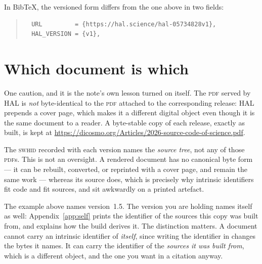\noindent In Bib\TeX{}, the versioned form differs from the one above in two fields:

\begin{quote}\footnotesize
\begin{verbatim}
  URL         = {https://hal.science/hal-05734828v1},
  HAL_VERSION = {v1},
\end{verbatim}
\end{quote}

\section{Which document is which}

One caution, and it is the note's own lesson turned on itself. The \textsc{pdf} served by HAL is
\emph{not} byte-identical to the \textsc{pdf} attached to the corresponding release: HAL prepends
a cover page, which makes it a different digital object even though it is the same document to a
reader. A byte-stable copy of each release, exactly as built, is kept at
\url{https://dicosmo.org/Articles/2026-source-code-of-science.pdf}.

The \textsc{swhid} recorded with each version names the \emph{source tree}, not any of those
\textsc{pdf}s. This is not an oversight. A rendered document has no canonical byte form --- it can
be rebuilt, converted, or reprinted with a cover page, and remain the same work --- whereas its
source does, which is precisely why intrinsic identifiers fit code and fit sources, and sit
awkwardly on a printed artefact.

The example above names version~1.5. The version you are holding names itself as well:
Appendix~\ref{app:self} prints the identifier of the sources this copy was built from, and
explains how the build derives it. The distinction matters. A document cannot carry an intrinsic
identifier of \emph{itself}, since writing the identifier in changes the bytes it names. It can
carry the identifier of the \emph{sources it was built from}, which is a different object, and
the one you want in a citation anyway.

